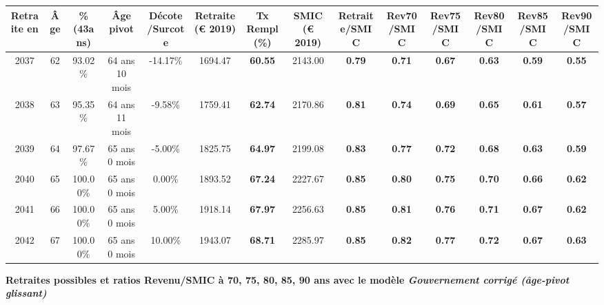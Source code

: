 \begin{adjustbox}{max width=\textwidth} 
\begin{tabular}[htb]{|c|c||c|c|c||c|c||c||c|c|c|c|c|c|} 
\hline 
 Retraite en &  Âge &  \%(43ans) &  Âge pivot &  Décote/Surcote &  Retraite (\euro{} 2019) &  Tx Rempl(\%) &  SMIC (\euro{} 2019) &  Retraite/SMIC &  Rev70/SMIC &  Rev75/SMIC &  Rev80/SMIC &  Rev85/SMIC &  Rev90/SMIC \\ 
\hline \hline 
 2037 &  62 &  93.02\% &  64 ans 10 mois &  -14.17\% &  1694.47 &  {\bf 60.55} &  2143.00 &  {\bf {\color{red} 0.79}} &  {\bf {\color{red} 0.71}} &  {\bf {\color{red} 0.67}} &  {\bf {\color{red} 0.63}} &  {\bf {\color{red} 0.59}} &  {\bf {\color{red} 0.55}} \\ 
\hline 
 2038 &  63 &  95.35\% &  64 ans 11 mois &  -9.58\% &  1759.41 &  {\bf 62.74} &  2170.86 &  {\bf {\color{red} 0.81}} &  {\bf {\color{red} 0.74}} &  {\bf {\color{red} 0.69}} &  {\bf {\color{red} 0.65}} &  {\bf {\color{red} 0.61}} &  {\bf {\color{red} 0.57}} \\ 
\hline 
 2039 &  64 &  97.67\% &  65 ans 0 mois &  -5.00\% &  1825.75 &  {\bf 64.97} &  2199.08 &  {\bf {\color{red} 0.83}} &  {\bf {\color{red} 0.77}} &  {\bf {\color{red} 0.72}} &  {\bf {\color{red} 0.68}} &  {\bf {\color{red} 0.63}} &  {\bf {\color{red} 0.59}} \\ 
\hline 
 2040 &  65 &  100.00\% &  65 ans 0 mois &  0.00\% &  1893.52 &  {\bf 67.24} &  2227.67 &  {\bf {\color{red} 0.85}} &  {\bf {\color{red} 0.80}} &  {\bf {\color{red} 0.75}} &  {\bf {\color{red} 0.70}} &  {\bf {\color{red} 0.66}} &  {\bf {\color{red} 0.62}} \\ 
\hline 
 2041 &  66 &  100.00\% &  65 ans 0 mois &  5.00\% &  1918.14 &  {\bf 67.97} &  2256.63 &  {\bf {\color{red} 0.85}} &  {\bf {\color{red} 0.81}} &  {\bf {\color{red} 0.76}} &  {\bf {\color{red} 0.71}} &  {\bf {\color{red} 0.67}} &  {\bf {\color{red} 0.62}} \\ 
\hline 
 2042 &  67 &  100.00\% &  65 ans 0 mois &  10.00\% &  1943.07 &  {\bf 68.71} &  2285.97 &  {\bf {\color{red} 0.85}} &  {\bf {\color{red} 0.82}} &  {\bf {\color{red} 0.77}} &  {\bf {\color{red} 0.72}} &  {\bf {\color{red} 0.67}} &  {\bf {\color{red} 0.63}} \\ 
\hline 
\hline 
\end{tabular} 
\end{adjustbox} 
 
 \vspace{0.1cm} 
{\bf \noindent Retraites possibles et ratios Revenu/SMIC à 70, 75, 80, 85, 90 ans avec le modèle \emph{Gouvernement corrigé (âge-pivot glissant)}}  
 
